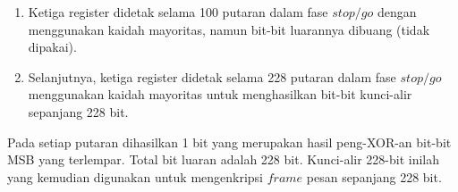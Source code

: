 \documentclass{article}
\begin{document}

\begin{enumerate}
  \item[3.] Ketiga register didetak selama 100 putaran dalam fase $stop/go$ dengan menggunakan kaidah mayoritas, namun bit-bit luarannya dibuang (tidak dipakai).
  \item[4.] Selanjutnya, ketiga register didetak selama 228 putaran dalam fase $stop/go$ menggunakan kaidah mayoritas untuk menghasilkan bit-bit kunci-alir sepanjang 228 bit.
\end{enumerate}

Pada setiap putaran dihasilkan 1 bit yang merupakan hasil peng-XOR-an bit-bit MSB yang terlempar. Total bit luaran adalah 228 bit. Kunci-alir 228-bit inilah yang kemudian digunakan untuk mengenkripsi $frame$ pesan sepanjang 228 bit.
\end{document}
